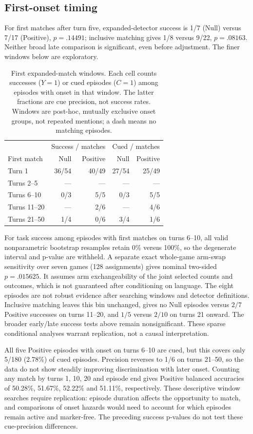 \documentclass[10pt,letterpaper]{article}
\begin{document}
\subsection{First-onset timing}\label{app:timing}
For first matches after turn five, expanded-detector success is 1/7 (Null) versus 7/17 (Positive), $p=.14491$; inclusive matching gives 1/8 versus 9/22, $p=.08163$. Neither broad late comparison is significant, even before adjustment. The finer windows below are exploratory.
\begin{table}[H]
\centering\small
\caption{First expanded-match windows. Each cell counts successes ($Y=1$) or cued episodes ($C=1$) among episodes with onset in that window. The latter fractions are cue precision, not success rates. Windows are post-hoc, mutually exclusive onset groups, not repeated mentions; a dash means no matching episodes.}
\begin{tabular}{lrrrr}\toprule
 & \multicolumn{2}{c}{Success / matches} & \multicolumn{2}{c}{Cued / matches}\\
First match & Null & Positive & Null & Positive\\\midrule
Turn 1 & 36/54 & 40/49 & 27/54 & 25/49\\
Turns 2--5 & --- & --- & --- & ---\\
Turns 6--10 & 0/3 & 5/5 & 0/3 & 5/5\\
Turns 11--20 & --- & 2/6 & --- & 4/6\\
Turns 21--50 & 1/4 & 0/6 & 3/4 & 1/6\\\bottomrule
\end{tabular}
\end{table}
For task success among episodes with first matches on turns 6--10, all valid nonparametric bootstrap resamples retain 0\% versus 100\%, so the degenerate interval and p-value are withheld. A separate exact whole-game arm-swap sensitivity over seven games (128 assignments) gives nominal two-sided $p=.015625$. It assumes arm exchangeability of the joint selected counts and outcomes, which is not guaranteed after conditioning on language. The eight episodes are not robust evidence after searching windows and detector definitions. Inclusive matching leaves this bin unchanged, gives no Null episodes versus $2/7$ Positive successes on turns 11--20, and $1/5$ versus $2/10$ on turns 21 onward. The broader early/late success tests above remain nonsignificant. These sparse conditional analyses warrant replication, not a causal interpretation.

All five Positive episodes with onset on turns 6--10 are cued, but this covers only 5/180 (2.78\%) of cued episodes. Precision reverses to 1/6 on turns 21--50, so the data do not show steadily improving discrimination with later onset. Counting any match by turns 1, 10, 20 and episode end gives Positive balanced accuracies of 50.28\%, 51.67\%, 52.22\% and 51.11\%, respectively. These descriptive window searches require replication: episode duration affects the opportunity to match, and comparisons of onset hazards would need to account for which episodes remain active and marker-free. The preceding success p-values do not test these cue-precision differences.
\end{document}
